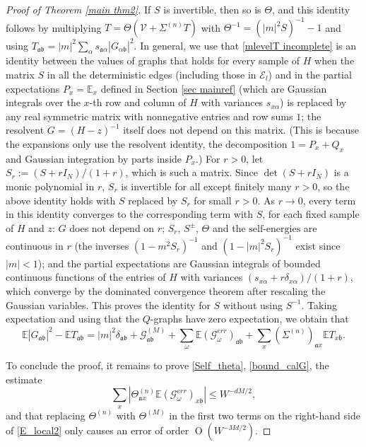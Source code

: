 \documentclass{article}
\newcommand{\1}{\mathds{1}}
\numberwithin{equation}{section}
\newcommand{\al}{\alpha}
\newcommand{\be}{\begin{equation}}
\newcommand{\ee}{\end{equation}}
\newcommand{\fa}{{\mathfrak a}}
\newcommand{\fb}{{\mathfrak b}}
\renewcommand{\cal}{\mathcal}
\renewcommand{\leq}{\leqslant}
\renewcommand{\le}{\leq}
\newcommand{\E}{\mathbb{E}}
\newcommand{\selfs}{\text{self-energies}}
\DeclareMathOperator{\OO}{O}
\theoremstyle{plain} %
\theoremstyle{remark}
\newcommand{\wtSdeltan}{\Sigma^{(n)}}
\newcommand{\Sele}{{\mathcal E}}
\begin{document}
\begin{proof}[Proof of Theorem \ref{main thm2}]
If $S$ is invertible, then so is $\Theta$, and this identity follows by multiplying $T=\Theta(\cal V+\wtSdeltan T)$ with $\Theta^{-1}=(|m|^2S)^{-1}-1$ and using $T_{\fa\fb}=|m|^2\sum_\al s_{\fa\al}|G_{\al\fb}|^2$. In general, we use that \eqref{mlevelT incomplete} is an identity between the values of graphs that holds for every sample of $H$ when the matrix $S$ in all the deterministic edges (including those in $\Sele_l$) and in the partial expectations $P_x=\E_x$ defined in Section \ref{sec mainref} (which are Gaussian integrals over the $x$-th row and column of $H$ with variances $s_{x\al}$) is replaced by any real symmetric matrix with nonnegative entries and row sums $1$; the resolvent $G=(H-z)^{-1}$ itself does not depend on this matrix. (This is because the expansions only use the resolvent identity, the decomposition $1=P_x+Q_x$ and Gaussian integration by parts inside $P_x$.) For $r>0$, let $S_r:=(S+rI_N)/(1+r)$, which is such a matrix. Since $\det(S+rI_N)$ is a monic polynomial in $r$, $S_r$ is invertible for all except finitely many $r>0$, so the above identity holds with $S$ replaced by $S_r$ for small $r>0$. As $r\to 0$, every term in this identity converges to the corresponding term with $S$, for each fixed sample of $H$ and $z$: $G$ does not depend on $r$; $S_r$, $S^\pm$, $\Theta$ and the $\selfs$ are continuous in $r$ (the inverses $(1-m^2S_r)^{-1}$ and $(1-|m|^2S_r)^{-1}$ exist since $|m|<1$); and the partial expectations are Gaussian integrals of bounded continuous functions of the entries of $H$ with variances $(s_{x\al}+r\delta_{x\al})/(1+r)$, which converge by the dominated convergence theorem after rescaling the Gaussian variables. This proves the identity for $S$ without using $S^{-1}$. Taking expectation and using that the $Q$-graphs have zero expectation, we obtain that
$$\E|G_{\fa\fb}|^2-\E T_{\fa\fb}=|m|^2\delta_{\fa\fb}+\cal G^{(M)}_{\fa\fb}+\sum_\omega\E\left(\cal G^{err}_\omega\right)_{\fa\fb}+\sum_x(\wtSdeltan)_{\fa x}\E T_{x\fb}.$$

To conclude the proof, it remains to prove \eqref{Self_theta}, \eqref{bound_calG}, the estimate
\be\label{err_Texpand}\sum_{x} \left| \Theta^{(n)}_{\fa x} \E\left(\cal G^{err}_\omega \right)_{x\fb}\right| \le W^{-dM/2} ,\ee
and that replacing $\Theta^{(n)}$ with $\Theta^{(M)}$ in the first two terms on the right-hand side of \eqref{E_local2} only causes an error of order $\OO(W^{-Md/2})$.


\end{proof}
\end{document}
